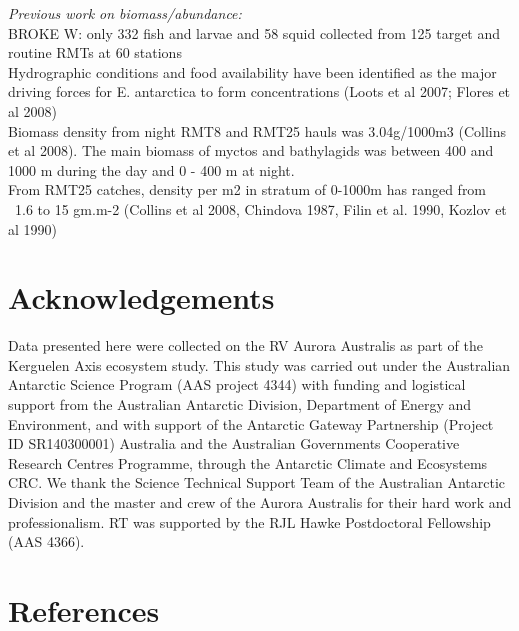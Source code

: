 \documentclass{article}
\begin{document}
\emph{Previous work on biomass/abundance:}\\
BROKE W: only 332 fish and larvae and 58 squid collected from 125 target and routine RMTs at 60 stations \citep{Vandeputte:2010}\\
Hydrographic conditions and food availability have been identified as the major driving forces for E. antarctica to form concentrations (Loots et al 2007; Flores et al 2008)\\
Biomass density from night RMT8 and RMT25 hauls was 3.04g/1000m3 (Collins et al 2008). The main biomass of myctos and bathylagids was between 400 and 1000 m during the day and 0 - 400 m at night. \\
From RMT25 catches, density per m2 in stratum of 0-1000m has ranged from ~1.6 to 15 gm.m-2 (Collins et al 2008, Chindova 1987, Filin et al. 1990, Kozlov et al 1990)


\section{Acknowledgements}
Data presented here were collected on the RV Aurora Australis as part of the Kerguelen Axis ecosystem study. This study was carried out under the Australian Antarctic Science Program (AAS project 4344) with funding and logistical support from the Australian Antarctic Division, Department of Energy and Environment, and with support of the Antarctic Gateway Partnership (Project ID SR140300001) Australia and the Australian Governments Cooperative Research Centres Programme, through the Antarctic Climate and Ecosystems CRC. We thank the Science Technical Support Team of the Australian Antarctic Division and the master and crew of the Aurora Australis for their hard work and professionalism.  RT was supported by the RJL Hawke Postdoctoral Fellowship (AAS 4366).

\section{References}
\renewcommand\refname{}
 
\renewcommand{\section}[2]{}

\end{document}
